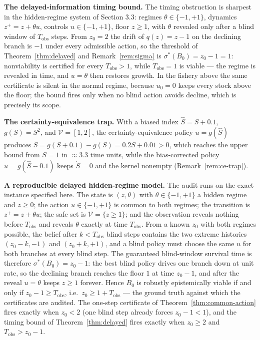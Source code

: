 \documentclass[10pt,twocolumn]{article}
\theoremstyle{definition}
\begin{document}
\textbf{The delayed-information timing bound.} The timing obstruction is sharpest in the hidden-regime system of Section 3.3: regimes \(\theta \in \{-1, +1\}\), dynamics \(z^{+} = z + \theta u\), controls \(u \in \{-1, +1\}\), floor \(z \ge 1\), with \(\theta\) revealed only after a blind window of \(T_{\mathrm{obs}}\) steps. From \(z_{0} = 2\) the drift of \(q(z) = z - 1\) on the declining branch is \(-1\) under every admissible action, so the threshold of Theorem~\ref{thm:delayed} and Remark~\ref{rem:sigma} is \(\sigma^{*}(B_{0}) = z_{0} - 1 = 1\): nonviability is certified for every \(T_{\mathrm{obs}} > 1\), while \(T_{\mathrm{obs}} = 1\) is viable --- the regime is revealed in time, and \(u = \theta\) then restores growth. In the fishery above the same certificate is silent in the normal regime, because \(u_{0} = 0\) keeps every stock above the floor; the bound fires only when no blind action avoids decline, which is precisely its scope.

\textbf{The certainty-equivalence trap.} With a biased index \(\hat{S} = S + 0.1\), \(g(S) = S^{2}\), and \(\mathcal{V} = [1,2]\), the certainty-equivalence policy \(u = g(\hat{S})\) produces \(\dot{S} = g(S+0.1) - g(S) = 0.2S + 0.01 > 0\), which reaches the upper bound from \(S = 1\) in \(\approx 3.3\) time units, while the bias-corrected policy \(u = g(\hat{S} - 0.1)\) keeps \(\dot{S} = 0\) and the kernel nonempty (Remark~\ref{rem:ce-trap}).

\textbf{A reproducible delayed hidden-regime model.} The audit runs on the exact instance specified here. The state is \((z, \theta)\) with \(\theta \in \{-1, +1\}\) a hidden regime and \(z \ge 0\); the action \(u \in \{-1, +1\}\) is common to both regimes; the transition is \(z^{+} = z + \theta u\); the safe set is \(\mathcal{V} = \{ z \ge 1 \}\); and the observation reveals nothing before \(T_{\mathrm{obs}}\) and reveals \(\theta\) exactly at time \(T_{\mathrm{obs}}\). From a known \(z_{0}\) with both regimes possible, the belief after \(k < T_{\mathrm{obs}}\) blind steps contains the two extreme histories \((z_{0} - k, -1)\) and \((z_{0} + k, +1)\), and a blind policy must choose the same \(u\) for both branches at every blind step. The guaranteed blind-window survival time is therefore \(\sigma^{*}(B_{0}) = z_{0} - 1\): the best blind policy drives one branch down at unit rate, so the declining branch reaches the floor \(1\) at time \(z_{0} - 1\), and after the reveal \(u = \theta\) keeps \(z \ge 1\) forever. Hence \(B_{0}\) is robustly epistemically viable if and only if \(z_{0} - 1 \ge T_{\mathrm{obs}}\), i.e.\ \(z_{0} \ge 1 + T_{\mathrm{obs}}\) --- the ground truth against which the certificates are audited. The one-step certificate of Theorem~\ref{thm:common-action} fires exactly when \(z_{0} < 2\) (one blind step already forces \(z_{0} - 1 < 1\)), and the timing bound of Theorem~\ref{thm:delayed} fires exactly when \(z_{0} \ge 2\) and \(T_{\mathrm{obs}} > z_{0} - 1\).
\end{document}
